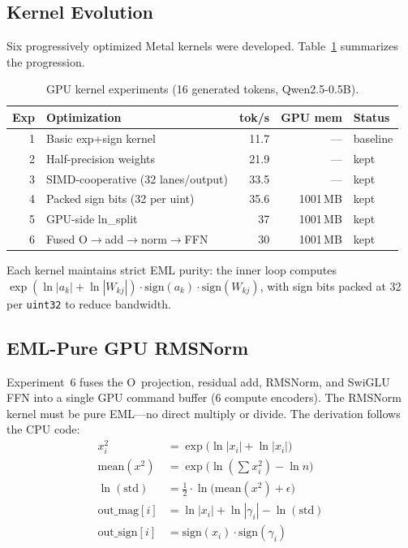 \documentclass[acmsmall,nonacm]{acmart}
\begin{document}
\subsection{Kernel Evolution}

Six progressively optimized Metal kernels were developed.  Table~\ref{tab:gpu-exps}
summarizes the progression.

\begin{table}[h]
\caption{GPU kernel experiments (16 generated tokens, Qwen2.5-0.5B).}
\label{tab:gpu-exps}
\centering
\small
\begin{tabular}{rlrrl}
\toprule
\textbf{Exp} & \textbf{Optimization} & \textbf{tok/s} & \textbf{GPU mem} & \textbf{Status} \\
\midrule
1 & Basic exp+sign kernel             & 11.7  & ---      & baseline \\
2 & Half-precision weights             & 21.9  & ---      & kept \\
3 & SIMD-cooperative (32 lanes/output) & 33.5  & ---      & kept \\
4 & Packed sign bits (32 per uint)     & 35.6  & 1001\,MB & kept \\
5 & GPU-side ln\_split                  & 37    & 1001\,MB & kept \\
6 & Fused O$\to$add$\to$norm$\to$FFN   & 30    & 1001\,MB & kept \\
\bottomrule
\end{tabular}
\end{table}

Each kernel maintains strict EML purity: the inner loop computes
$\exp(\ln|a_k| + \ln|W_{kj}|) \cdot \mathrm{sign}(a_k) \cdot \mathrm{sign}(W_{kj})$,
with sign bits packed at 32 per \texttt{uint32} to reduce bandwidth.

\subsection{EML-Pure GPU RMSNorm}

Experiment~6 fuses the O~projection, residual add, RMSNorm, and
SwiGLU FFN into a single GPU command buffer (6 compute encoders).
The RMSNorm kernel must be pure EML---no direct multiply or divide.
The derivation follows the CPU code:
\begin{align}
  x^2_i &= \exp\!\big(\ln|x_i| + \ln|x_i|\big) \label{eq:eml-sq}\\
  \mathrm{mean}(x^2) &= \exp\!\big(\ln(\textstyle\sum x^2_i) - \ln n\big) \label{eq:eml-div}\\
  \ln(\mathrm{std}) &= \tfrac{1}{2}\cdot\ln\!\big(\mathrm{mean}(x^2) + \epsilon\big) \label{eq:eml-sqrt}\\
  \text{out\_mag}[i] &= \ln|x_i| + \ln|\gamma_i| - \ln(\mathrm{std}) \label{eq:eml-norm}\\
  \text{out\_sign}[i] &= \mathrm{sign}(x_i) \cdot \mathrm{sign}(\gamma_i) \label{eq:eml-normsign}
\end{align}
\end{document}
